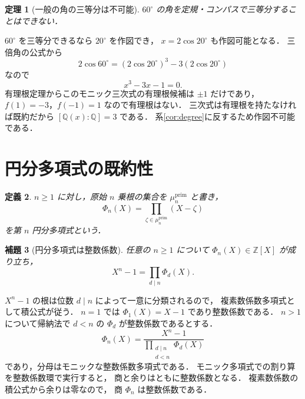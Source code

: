 \documentclass[a5paper,10pt,onecolumn]{jsarticle}
\makeatletter
\theoremstyle{mathnotetheorem}
\newtheorem{theorem}{定理}[section]
\newtheorem{definition}[theorem]{定義}
\newtheorem{lemma}[theorem]{補題}
\renewcommand{\proofname}{証明}
\renewenvironment{proof}[1][\proofname]{%
  \par\pushQED{\qed}\normalfont\topsep4\p@\@plus2\p@\relax
  \trivlist\item[\hskip\labelsep\bfseries #1]\ignorespaces
}{\popQED\endtrivlist\@endpefalse}
\makeatother
\begin{document}
\begin{theorem}[一般の角の三等分は不可能]
\label{thm:trisection}
$60^\circ$ の角を定規・コンパスで三等分することはできない．
\end{theorem}
\begin{proof}
$60^\circ$ を三等分できるなら $20^\circ$ を作図でき，
$x=2\cos20^\circ$ も作図可能となる．
三倍角の公式から
\[
 2\cos60^\circ
 =(2\cos20^\circ)^3-3(2\cos20^\circ)
\]
なので
\[
 x^3-3x-1=0.
\]
有理根定理からこのモニック三次式の有理根候補は
$\pm1$ だけであり，
$f(1)=-3$，$f(-1)=1$ なので有理根はない．
三次式は有理根を持たなければ既約だから
$[\mathbb Q(x):\mathbb Q]=3$ である．
系\ref{cor:degree}に反するため作図不可能である．
\end{proof}

\section{円分多項式の既約性}

\begin{definition}
$n\ge1$ に対し，原始 $n$ 乗根の集合を
$\mu_n^{\mathrm{prim}}$ と書き，
\[
 \Phi_n(X)=\prod_{\zeta\in\mu_n^{\mathrm{prim}}}(X-\zeta)
\]
を\emph{第 $n$ 円分多項式}という．
\end{definition}

\begin{lemma}[円分多項式は整数係数]\label{lem:cyclotomic-integral}
任意の $n\ge1$ について
$\Phi_n(X)\in\mathbb Z[X]$ が成り立ち，
\[
 X^n-1=\prod_{d\mid n}\Phi_d(X).
\]
\end{lemma}
\begin{proof}
$X^n-1$ の根は位数 $d\mid n$ によって一意に分類されるので，
複素数係数多項式として積公式が従う．
$n=1$ では $\Phi_1(X)=X-1$ であり整数係数である．
$n>1$ について帰納法で
$d<n$ の $\Phi_d$ が整数係数であるとする．
\[
 \Phi_n(X)=\frac{X^n-1}{\prod_{\substack{d\mid n\\d<n}}\Phi_d(X)}
\]
であり，分母はモニックな整数係数多項式である．
モニック多項式での割り算を整数係数環で実行すると，
商と余りはともに整数係数となる．
複素数係数の積公式から余りは零なので，
商 $\Phi_n$ は整数係数である．
\end{proof}
\end{document}
